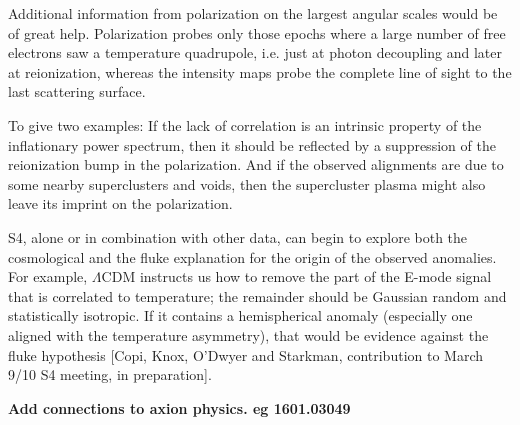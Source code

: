 Additional information from polarization on the largest angular scales would be of great help. Polarization probes only those epochs where a large number of free electrons saw a temperature quadrupole, i.e. just at photon decoupling and later at reionization, whereas the intensity maps probe the complete line of sight to the last scattering surface.
 
To give two examples: If the lack of correlation is an intrinsic property of the inflationary power spectrum, then it should be reflected by a suppression of the reionization bump in the polarization. And if the observed alignments are due to some nearby superclusters and voids, then the supercluster plasma might also leave its imprint on the polarization. 

S4, alone or in combination with other data, can begin to explore both the cosmological and the fluke explanation for the origin of the observed anomalies.  For example, $\Lambda$CDM instructs us how to remove the part of the E-mode signal that is correlated to temperature; the remainder should be Gaussian random and statistically isotropic.  If it contains a hemispherical anomaly (especially one aligned with the temperature asymmetry), that would be evidence against the fluke hypothesis [Copi, Knox, O’Dwyer and Starkman, contribution to March 9/10 S4 meeting, in preparation]. 

{\bf Add connections to axion physics. eg 1601.03049}

